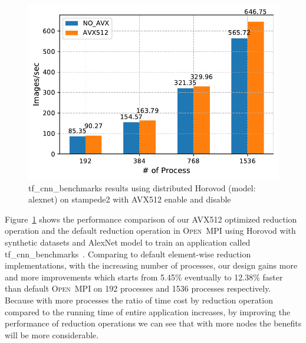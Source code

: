 \documentclass[sigconf,review]{acmart}
\newcommand{\ompi}[0]{\textsc{Open~MPI}\xspace}
\begin{document}
\begin{figure}[h]
    \centering
    \includegraphics[width=\linewidth]{horovod_tacc.pdf}
    \caption{tf\_cnn\_benchmarks results using distributed Horovod (model: alexnet) on stampede2 with AVX512 enable and disable}
    \label{fig:horovod_tacc}
\end{figure}
Figure~\ref{fig:horovod_tacc} shows the performance comparison of
our AVX512 optimized reduction operation and the default reduction operation in \ompi
using Horovod with synthetic datasets and AlexNet model to train an application called
tf\_cnn\_benchmarks~\cite{cnn_Tensorflow}.
Comparing to default element-wise reduction
implementations, with the increasing number of processes,
our design gains more and more improvements which starts from 5.45\% eventually to 12.38\% faster than default \ompi on 192 processes and 1536 processes respectively.
Because with more processes the ratio of time cost by reduction operation compared to the running time of entire application increases, by improving the performance of reduction operations we can see that with more nodes the benefits will be more considerable.

\end{document}
